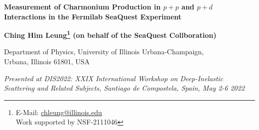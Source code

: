 \documentclass[10pt,a4paper,final]{article}
\begin{document}
\begin{center}
	{\LARGE \bf Measurement of Charmonium Production in $p + p$ and $p + d$ Interactions in the Fermilab SeaQuest Experiment}

	\par\vspace*{2.5mm}\par

	{

		\bigskip

		\large \bf Ching Him Leung\footnote{E-Mail: \href{mailto:chleung@illinois.edu}{chleung@illinois.edu}\\Work supported by NSF-2111046} (on behalf of the SeaQuest Collboration)}

	\vspace*{2.5mm}

	{Department of Physics, University of Illinois Urbana-Champaign, \\Urbana, Illinois 61801, USA}

	\vspace*{2.5mm}

	{\it Presented at DIS2022: XXIX International Workshop on Deep-Inelastic Scattering and Related Subjects, Santiago de Compostela, Spain, May 2-6 2022}


	\vspace*{2.5mm}


\end{center}
\begin{abstract}
	The Fermilab SeaQuest experiment has measured dimuon events from the interaction
	of \SI{120}{\GeV} proton beam on liquid hydrogen and deuterium targets with dimuon
	mass between \num{2} and \SI{9}{\GeV}. These dimuon events contain both the Drell-Yan
	process and the charmonium ($J/\psi$ and $\psi^\prime$) production. Unlike the Drell-Yan process
	which probes the antiquark distributions in the nucleons, the charmonium production
	is sensitive to both quark and gluon distributions. SeaQuest has extracted the
	$\sigma^{pd}/2\sigma^{pp}$ ratios as well as the differential cross sections for
	charmonium production in the kinematic region of $0.4 < x_F < 0.9$. The $\sigma^{pd}/2\sigma^{pp}$
	ratios for charmonium production are found to be significantly different
	from that of the Drell-Yan process. The measured differential cross sections for
	charmonium production are compared with theoretical calculations using Color Evaporation Model
	and Non-Relativistic QCD model.
\end{abstract}
\end{document}
